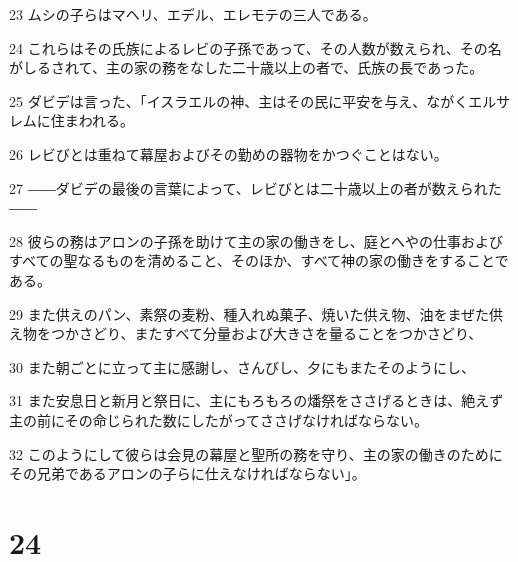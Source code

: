 \par 23 ムシの子らはマヘリ、エデル、エレモテの三人である。
\par 24 これらはその氏族によるレビの子孫であって、その人数が数えられ、その名がしるされて、主の家の務をなした二十歳以上の者で、氏族の長であった。
\par 25 ダビデは言った、「イスラエルの神、主はその民に平安を与え、ながくエルサレムに住まわれる。
\par 26 レビびとは重ねて幕屋およびその勤めの器物をかつぐことはない。
\par 27 ――ダビデの最後の言葉によって、レビびとは二十歳以上の者が数えられた――
\par 28 彼らの務はアロンの子孫を助けて主の家の働きをし、庭とへやの仕事およびすべての聖なるものを清めること、そのほか、すべて神の家の働きをすることである。
\par 29 また供えのパン、素祭の麦粉、種入れぬ菓子、焼いた供え物、油をまぜた供え物をつかさどり、またすべて分量および大きさを量ることをつかさどり、
\par 30 また朝ごとに立って主に感謝し、さんびし、夕にもまたそのようにし、
\par 31 また安息日と新月と祭日に、主にもろもろの燔祭をささげるときは、絶えず主の前にその命じられた数にしたがってささげなければならない。
\par 32 このようにして彼らは会見の幕屋と聖所の務を守り、主の家の働きのためにその兄弟であるアロンの子らに仕えなければならない」。

\chapter{24}

